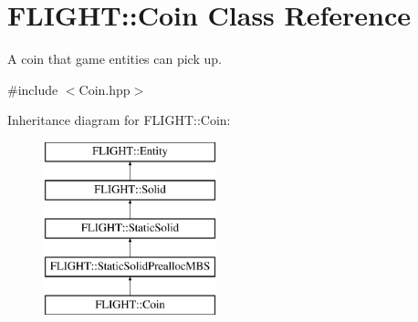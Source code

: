 \hypertarget{class_f_l_i_g_h_t_1_1_coin}{}\section{F\+L\+I\+G\+HT\+:\+:Coin Class Reference}
\label{class_f_l_i_g_h_t_1_1_coin}


A coin that game entities can pick up.  




{\ttfamily \#include $<$Coin.\+hpp$>$}

Inheritance diagram for F\+L\+I\+G\+HT\+:\+:Coin\+:\begin{figure}[H]
\begin{center}
\leavevmode
\includegraphics[height=5.000000cm]{class_f_l_i_g_h_t_1_1_coin}
\end{center}
\end{figure}
